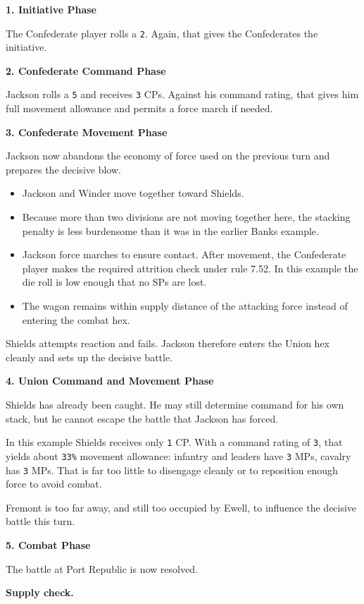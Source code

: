 \documentclass[11pt]{article}
\begin{document}
\textbf{1. Initiative Phase}

The Confederate player rolls a \texttt{2}. Again, that gives the Confederates the initiative.

\textbf{2. Confederate Command Phase}

Jackson rolls a \texttt{5} and receives \texttt{3} CPs. Against his command rating, that gives him full movement allowance and permits a force march if needed.

\textbf{3. Confederate Movement Phase}

Jackson now abandons the economy of force used on the previous turn and prepares the decisive blow.

\begin{itemize}
\item Jackson and Winder move together toward Shields.
\item Because more than two divisions are not moving together here, the stacking penalty is less burdensome than it was in the earlier Banks example.
\item Jackson force marches to ensure contact. After movement, the Confederate player makes the required attrition check under rule 7.52. In this example the die roll is low enough that no SPs are lost.
\item The wagon remains within supply distance of the attacking force instead of entering the combat hex.
\end{itemize}

Shields attempts reaction and fails. Jackson therefore enters the Union hex cleanly and sets up the decisive battle.

\textbf{4. Union Command and Movement Phase}

Shields has already been caught. He may still determine command for his own stack, but he cannot escape the battle that Jackson has forced.

In this example Shields receives only \texttt{1} CP. With a command rating of \texttt{3}, that yields about \texttt{33\%} movement allowance: infantry and leaders have \texttt{3} MPs, cavalry has \texttt{3} MPs. That is far too little to disengage cleanly or to reposition enough force to avoid combat.

Fremont is too far away, and still too occupied by Ewell, to influence the decisive battle this turn.

\textbf{5. Combat Phase}

The battle at Port Republic is now resolved.

\textbf{Supply check.}
\end{document}
